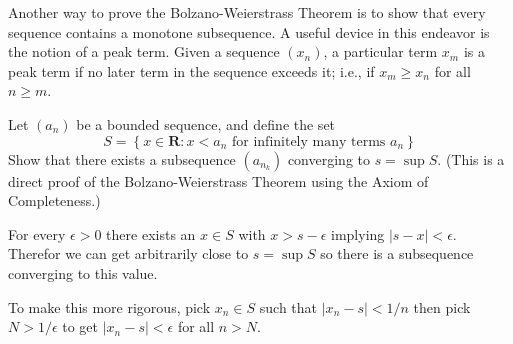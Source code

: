 \begin{exercise}
  Another way to prove the Bolzano-Weierstrass Theorem is to show that every sequence contains a monotone subsequence. A useful device in this endeavor is the notion of a peak term. Given a sequence $\left(x_{n}\right)$, a particular term $x_{m}$ is a peak term if no later term in the sequence exceeds it; i.e., if $x_{m} \geq x_{n}$ for all $n \geq m$.
\end{exercise}

\begin{solution}
\end{solution}


\begin{exercise}
  Let $\left(a_{n}\right)$ be a bounded sequence, and define the set
  $$
  S=\left\{x \in \mathbf{R}: x<a_{n} \text { for infinitely many terms } a_{n}\right\}
  $$
  Show that there exists a subsequence $\left(a_{n_{k}}\right)$ converging to $s=\sup S$. (This is a direct proof of the Bolzano-Weierstrass Theorem using the Axiom of Completeness.)
\end{exercise}

\begin{solution}
  For every $\epsilon > 0$ there exists an $x \in S$ with $x > s - \epsilon$ implying $|s-x| < \epsilon$. Therefor we can get arbitrarily close to $s = \sup S$ so there is a subsequence converging to this value.

  To make this more rigorous, pick $x_n \in S$ such that $|x_n - s| < 1/n$ then pick $N > 1/\epsilon$ to get $|x_n - s| < \epsilon$ for all $n > N$.
\end{solution}
